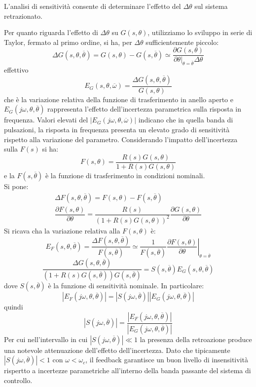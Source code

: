 \documentclass[a4paper]{report}
\begin{document}
L'analisi di sensitivit\`a consente di determinare l'effetto del
$\Delta \theta$ sul sistema retrazionato.

Per quanto riguarda l'effetto di $\Delta \theta$ su $G(s, \theta)$,
utilizziamo lo sviluppo in serie di Taylor, fermato al primo ordine,
si ha, per $\Delta \theta$ sufficientemente piccolo:
\[
\Delta G(s, \theta, \overline{\theta}) = G(s, \theta) - G(s,
\overline{\theta}) \simeq \dfrac{\partial G(s,
  \theta)}{\left. \partial \theta \right|_{\theta = \overline{\theta}}
\Delta \theta}
\]
effettivo
\[
E_G(s, \theta, \overline{\omega}) = \dfrac{\Delta G(s, \theta,
  \overline{\theta})}{G(s, \theta)}
\]
che \`e la variazione relativa della funzione di trasferimento in
anello aperto e $E_G(j \omega, \theta, \overline{\theta})$ rappresenta
l'effetto dell'incertezza parametrica sulla risposta in
frequenza. Valori elevati del $|E_G(j \omega, \theta,
\overline{\omega})|$ indicano che in quella banda di pulsazioni, la
risposta in frequenza presenta un elevato grado di sensitivit\`a
rispetto alla variazione del parametro. Considerando l'impatto
dell'incertezza sulla $F(s)$ si ha:
\[
F(s, \theta) = \dfrac{R(s) G(s, \theta)}{1 + R(s) G(s, \theta)}
\]
e la $F(s, \overline{\theta})$ \`e la funzione di trasferimento in
condizioni nominali.\\
Si pone:
\[
\begin{array}{l}
  \Delta F(s, \theta, \overline{\theta}) = F(s, \theta) - F(s,
  \overline{\theta})\\
  \dfrac{\partial F(s, \theta)}{\partial \theta} = \dfrac{R(s)}{(1 +
    R(s) G(s, \theta))^2} \dfrac{\partial G(s, \theta)}{\partial
    \theta}
\end{array}
\]
Si ricava cha la variazione relativa alla $F(s, \theta)$ \`e:
\[
E_F(s, \theta, \overline{\theta}) = \dfrac{\Delta F(s, \theta,
  \overline{\theta})}{F(s, \overline{\theta})} \simeq \dfrac{1}{F(s,
  \overline{\theta})} \left. \dfrac{\partial F(s, \theta)}{\partial
  \theta} \right |_{\theta = \overline{\theta}}
\]
\[
\dfrac{\Delta G(s, \theta, \overline{\theta})}{(1 + R(s)G(s,
  \overline{\theta}))G(s, \overline{\theta})} = S(s,
\overline{\theta})E_G(s, \theta, \overline{\theta})
\]
dove $S(s, \overline{\theta})$ \`e la funzione di sensitivit\`a
nominale. In particolare:
\[
|E_F(j \omega, \theta, \overline{\theta})| = |S(j \omega,
\overline{\theta})||E_G(j \omega, \theta, \overline{\theta})|
\]
quindi
\[
|S(j \omega, \overline{\theta})| = \dfrac{|E_F(j \omega, \theta,
  \overline{\theta})|}{|E_G(j \omega, \theta, \overline{\theta})|}
\]
Per cui nell'intervallo in cui $|S(j \omega, \overline{\theta})| \ll
1$ la presenza della retroazione produce una notevole attenuazione
dell'effetto dell'incertezza. Dato che tipicamente $|S(j \omega,
\overline{\theta})| < 1$ con $\omega < \omega_c$, il feedback
garantisce un buon livello di insensitivit\`a rispertto a incertezze
parametriche all'interno della banda passante del sistema di
controllo.
\end{document}
